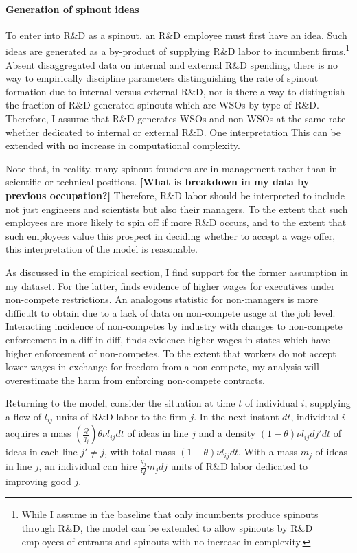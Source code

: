 \documentclass[12pt,english]{article}
\theoremstyle{remark}
\begin{document}
\paragraph{Generation of spinout ideas}

To enter into R\&D as a spinout, an R\&D employee must first have an idea. Such ideas are generated as a by-product of supplying R\&D labor to incumbent firms.\footnote{While I assume in the baseline that only incumbents produce spinouts through R\&D, the model can be extended to allow spinouts by R\&D employees of entrants and spinouts with no increase in complexity.} Absent disaggregated data on internal and external R\&D spending, there is no way to empirically discipline parameters distinguishing the rate of spinout formation due to internal versus external R\&D, nor is there a way to distinguish the fraction of R\&D-generated spinouts which are WSOs by type of R\&D. Therefore, I assume that R\&D generates WSOs and non-WSOs at the same rate whether dedicated to internal or external R\&D. One interpretation This can be extended with no increase in computational complexity. 

Note that, in reality, many spinout founders are in management rather than in scientific or technical positions. \textbf{[What is breakdown in my data by previous occupation?] }Therefore, R\&D labor should be interpreted to include not just engineers and scientists but also their managers. To the extent that such employees are more likely to spin off if more R\&D occurs, and to the extent that such employees value this prospect in deciding whether to accept a wage offer, this interpretation of the model is reasonable. 

As discussed in the empirical section, I find support for the former assumption in my dataset. For the latter, \cite{shi_restrictions_2018} finds evidence of higher wages for executives under non-compete restrictions. An analogous statistic for non-managers is more difficult to obtain due to a lack of data on non-compete usage at the job level. Interacting incidence of non-competes by industry with changes to non-compete enforcement in a diff-in-diff, \cite{starr_consider_2018} finds evidence higher wages in states which have higher enforcement of non-competes. To the extent that workers do not accept lower wages in exchange for freedom from a non-compete, my analysis will overestimate the harm from enforcing non-compete contracts. 

Returning to the model, consider the situation at time $t$ of individual $i$, supplying a flow of $l_{ij}$ units of R\&D labor to the firm $j$. In the next instant $dt$, individual $i$ acquires a mass $(\frac{Q}{q_j}) \theta \nu l_{ij} dt$ of ideas in line $j$ and a density $(1-\theta)\nu l_{ij} dj' dt$ of ideas in each line $j' \ne j$, with total mass $(1-\theta) \nu l_{ij} dt$. With a mass $m_j$ of ideas in line $j$, an individual can hire $\frac{q_j}{Q}m_jdj$ units of R\&D labor dedicated to improving good $j$.  
\end{document}
